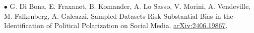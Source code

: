 \documentclass[a4paper,12pt]{article}
\begin{document}

$\bullet$ G. Di Bona, E. Fraxanet, B. Komander, A. Lo Sasso, V. Morini, A. Vendeville, M. Falkenberg, A. Galeazzi. Sampled Datasets Risk Substantial Bias in the Identification of Political Polarization on Social Media. \href{https://arxiv.org/abs/2406.19867}{arXiv:2406.19867}.










\end{document}
